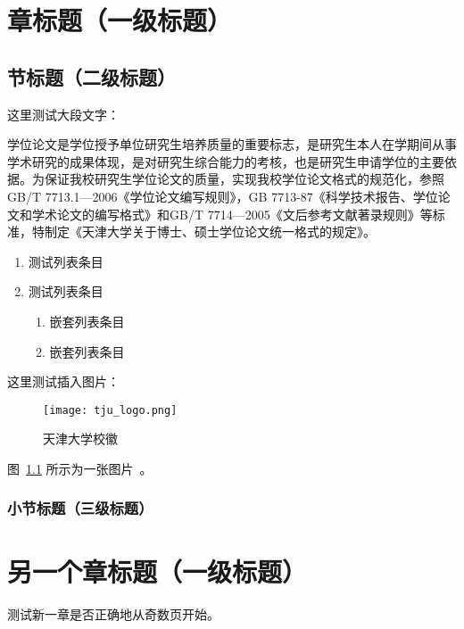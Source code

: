 
\chapter{章标题（一级标题）}

\section{节标题（二级标题）}

这里测试大段文字：

学位论文是学位授予单位研究生培养质量的重要标志，是研究生本人在学期间从事学术研究的成果体现，是对研究生综合能力的考核，也是研究生申请学位的主要依据。为保证我校研究生学位论文的质量，实现我校学位论文格式的规范化，参照GB/T 7713.1—2006《学位论文编写规则》，GB 7713-87《科学技术报告、学位论文和学术论文的编写格式》和GB/T 7714—2005《文后参考文献著录规则》等标准，特制定《天津大学关于博士、硕士学位论文统一格式的规定》。

\begin{enumerate}[label={（\arabic*）}]
    \item 测试列表条目
    \item 测试列表条目 
    \begin{enumerate}[label={（\roman*）}]
        \item 嵌套列表条目
        \item 嵌套列表条目
    \end{enumerate}
\end{enumerate}

这里测试插入图片：
\begin{figure}[!h]
    \centering\small
    \texttt{[image: tju\_logo.png]}
    \caption{天津大学校徽}
    \label{fig:logo}
\end{figure}
图~\ref{fig:logo} 所示为一张图片~\cite{mittelbach2004}。

\subsection{小节标题（三级标题）}

\chapter{另一个章标题（一级标题）}

测试新一章是否正确地从奇数页开始。